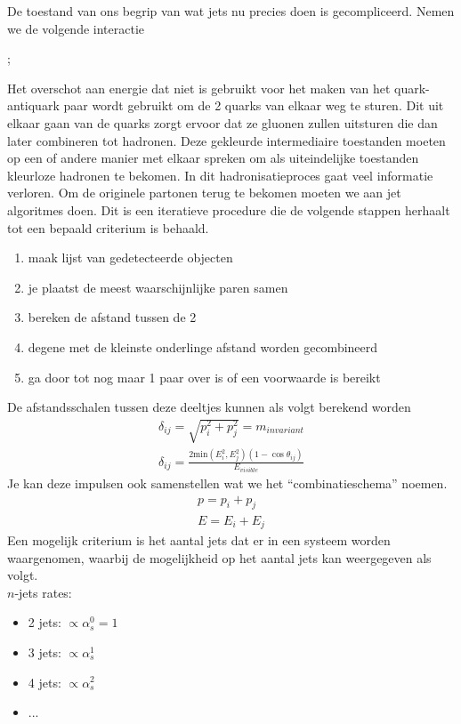 \documentclass[../main.tex]{subfiles}
\begin{document}
De toestand van ons begrip van wat jets nu precies doen is gecompliceerd. Nemen we de volgende interactie\\
\begin{center}
;
\end{center}
Het overschot aan energie dat niet is gebruikt voor het maken van het quark-antiquark paar wordt gebruikt om de 2 quarks van elkaar weg te sturen. Dit uit elkaar gaan van de quarks zorgt ervoor dat ze gluonen zullen uitsturen die dan later combineren tot hadronen. Deze gekleurde intermediaire toestanden moeten op een of andere manier met elkaar spreken om als uiteindelijke toestanden kleurloze hadronen te bekomen. In dit hadronisatieproces gaat veel informatie verloren. Om de originele partonen terug te bekomen moeten we aan jet algoritmes doen. Dit is een iteratieve procedure die de volgende stappen herhaalt tot een bepaald criterium is behaald.
\begin{enumerate}
    \item maak lijst van gedetecteerde objecten
    \item je plaatst de meest waarschijnlijke paren samen
    \item bereken de afstand tussen de 2
    \item degene met de kleinste onderlinge afstand worden gecombineerd
    \item ga door tot nog maar 1 paar over is of een voorwaarde is bereikt
\end{enumerate}
De afstandsschalen tussen deze deeltjes kunnen als volgt berekend worden
\begin{equation}
    \begin{aligned}
        \label{eq:jet_alg_afstand}
        \delta_{ij} = \sqrt{p_i^2+p_j^2} = m_{invariant}\\
        \delta_{ij} = \frac{2\text{min}(E_i^2,E_j^2)(1-\cos\theta_{ij})}{E_{visible}} 
    \end{aligned}
\end{equation}
Je kan deze impulsen ook samenstellen wat we het ``combinatieschema'' noemen.
\begin{equation}
    \begin{aligned}
        \label{eq:comb_scheme}
        p=p_i+p_j\\
        E=E_i+E_j
    \end{aligned}
\end{equation}
Een mogelijk criterium is het aantal jets dat er in een systeem worden waargenomen, waarbij de mogelijkheid op het aantal jets kan weergegeven als volgt.\\
$n$-jets rates:
\begin{itemize}
    \item 2 jets: $\propto \alpha_s^0 = 1$
    \item 3 jets: $\propto \alpha_s^1$
    \item 4 jets: $\propto \alpha_s^2$
    \item ...
\end{itemize}
\end{document}
